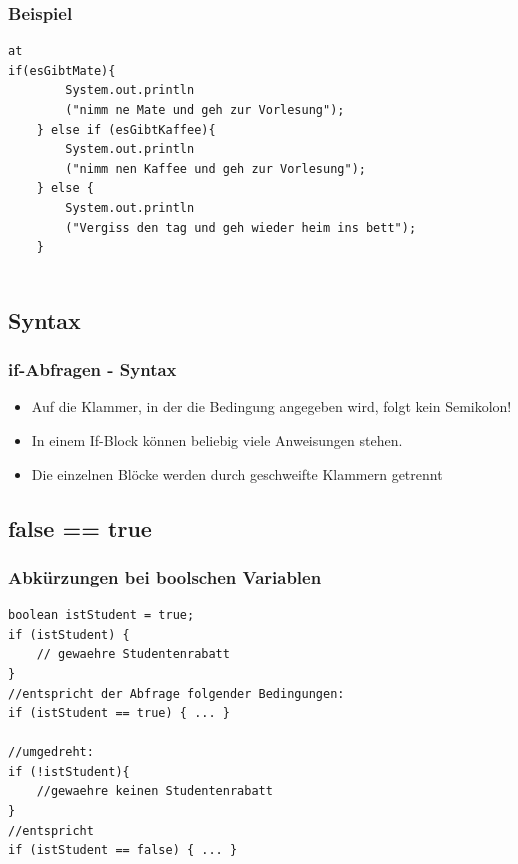 \documentclass[final]{beamer}
\begin{document}
\begin{frame}[containsverbatim]
	\frametitle{Beispiel}
	\begin{lstlisting}at
if(esGibtMate){
		System.out.println
		("nimm ne Mate und geh zur Vorlesung");
	} else if (esGibtKaffee){
		System.out.println
		("nimm nen Kaffee und geh zur Vorlesung");
	} else {
		System.out.println
		("Vergiss den tag und geh wieder heim ins bett");
	}
	
	\end{lstlisting}
\end{frame}

\subsection{Syntax}
\begin{frame}
	\frametitle{if-Abfragen - Syntax}
	\begin{itemize}
		\item{Auf die Klammer, in der die Bedingung angegeben wird, folgt kein Semikolon!}
		\item{In einem If-Block können beliebig viele Anweisungen stehen.}
		\item{Die einzelnen Blöcke werden durch geschweifte Klammern getrennt}
	\end{itemize}
\end{frame}


\subsection{false == true}
\begin{frame}[containsverbatim]
	\frametitle{Abkürzungen bei boolschen Variablen}
	\begin{lstlisting}
boolean istStudent = true;
if (istStudent) {
	// gewaehre Studentenrabatt
}
//entspricht der Abfrage folgender Bedingungen:
if (istStudent == true) { ... }

//umgedreht:
if (!istStudent){
	//gewaehre keinen Studentenrabatt
}
//entspricht
if (istStudent == false) { ... }
	\end{lstlisting}
\end{frame}
\end{document}
